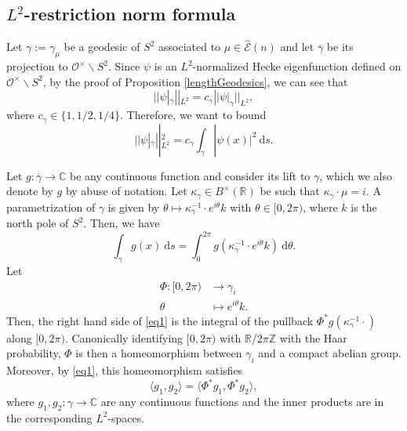 \documentclass[11pt]{amsart}
\newcommand{\bigo}{\mathcal{O}}
\newcommand{\R}{\mathbb{R}}
\newcommand{\Z}{\mathbb{Z}}
\newcommand{\C}{\mathbb{C}}
\theoremstyle{definition}
\theoremstyle{remark}
\begin{document}
\subsection{\texorpdfstring{$L^2$}{L2}-restriction norm formula}

Let $\gamma:=\gamma_{\mu}$ be a geodesic of $S^2$ associated to $\mu \in \widehat{\mathcal{E}}(n)$ and let $\overline{\gamma}$ be its projection to $\bigo^{\times} \backslash S^2$. Since $\psi$ is an $L^2$-normalized Hecke eigenfunction defined on $\bigo^{\times} \backslash S^2$, by the proof of Proposition \ref{lengthGeodesics}, we can see that
\begin{equation}
    ||\psi|_{\overline{\gamma}}||_{L^2} = c_{\gamma} ||\psi|_{\gamma}||_{L^2}, \label{eq-1}
\end{equation}
where $c_{\gamma}\in \{1,1/2,1/4\}$. 
Therefore, we want to bound 
\begin{equation*}
    ||\psi|_{\overline{\gamma}} ||_{L^2}^2 = c_{\gamma} \int_{\gamma} |\psi(x)|^2 \: \mathrm{d}s.
\end{equation*} 

Let $g:\overline{\gamma} \rightarrow \C$ be any continuous function and consider its lift to $\gamma$, which we also denote by $g$ by abuse of notation. Let $\kappa_{\gamma} \in B^{\times}(\R)$ be such that $\kappa_{\gamma} \cdot \mu = i$. A parametrization of $\gamma$ is given by $\theta \mapsto \kappa_{\gamma}^{-1} \cdot e^{i \theta} k$ with $\theta \in [0,2\pi)$, where $k$ is the north pole of $S^2$. Then, we have
\begin{equation}
    \int_{\gamma} g(x) \: \mathrm{d}s = \int_{0}^{2\pi} g\left(\kappa_{\gamma}^{-1} \cdot e^{i \theta} k \right) \: \mathrm{d}\theta. \label{eq1}
\end{equation}
Let 
\begin{align*}
    \Phi : [0,2\pi) & \rightarrow \gamma_i \\
    \theta & \mapsto e^{i \theta}k.
\end{align*}
Then, the right hand side of \eqref{eq1} is the integral of the pullback $\Phi^{*} g( \kappa_{\gamma}^{-1} \cdot )$ along $[0,2\pi)$. Canonically identifying $[0,2\pi)$ with $\R/2\pi\Z$ with the Haar probability, $\Phi$ is then a homeomorphism between $\gamma_i$ and a compact abelian group. Moreover, by \eqref{eq1}, this homeomorphism satisfies 
\begin{equation}
    \langle g_1, g_2 \rangle = \langle \Phi^{*} g_1, \Phi^{*} g_2 \rangle, \label{eq2}
\end{equation}
where $g_1,g_2 : \gamma \rightarrow \C$ are any continuous functions and the inner products are in the corresponding $L^2$-spaces. 
\end{document}
